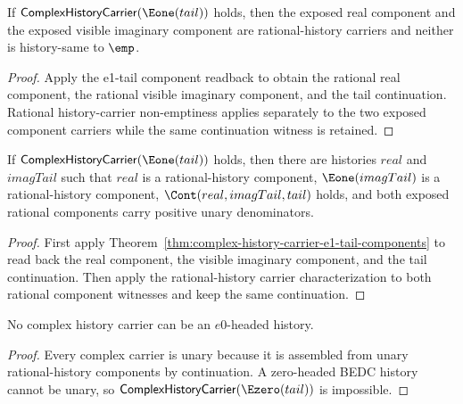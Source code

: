 \begin{theorem}
\label{thm:complex-history-carrier-e1-tail-components-nonempty}
If $\mathsf{ComplexHistoryCarrier}(\Eone(tail))$ holds, then the exposed real
component and the exposed visible imaginary component are rational-history
carriers and neither is history-same to $\emp$.
\end{theorem}
\begin{proof}
Apply the e1-tail component readback to obtain the rational real component,
the rational visible imaginary component, and the tail continuation. Rational
history-carrier non-emptiness applies separately to the two exposed component
carriers while the same continuation witness is retained.
\end{proof}

\begin{theorem}
\label{thm:complex-history-carrier-e1-tail-positive-components}
If $\mathsf{ComplexHistoryCarrier}(\Eone(tail))$ holds, then there are histories
$real$ and $imagTail$ such that $real$ is a rational-history component,
$\Eone(imagTail)$ is a rational-history component, $\Cont(real,imagTail,tail)$
holds, and both exposed rational components carry positive unary denominators.
\end{theorem}
\begin{proof}
First apply Theorem~\ref{thm:complex-history-carrier-e1-tail-components} to
read back the real component, the visible imaginary component, and the tail
continuation. Then apply the rational-history carrier characterization to both
rational component witnesses and keep the same continuation.
\end{proof}

\begin{theorem}
\label{thm:complex-history-carrier-e0-endpoint-absurd}
No complex history carrier can be an \(e0\)-headed history.
\end{theorem}
\begin{proof}
Every complex carrier is unary because it is assembled from unary
rational-history components by continuation. A zero-headed BEDC history cannot
be unary, so \(\mathsf{ComplexHistoryCarrier}(\Ezero(tail))\) is impossible.
\end{proof}

